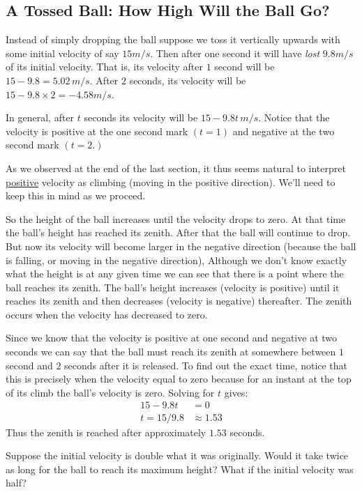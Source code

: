 \subsection{A Tossed Ball: How High Will the Ball Go?}
\label{subsec:tossed-ball}

Instead of simply dropping the ball suppose we toss it vertically
upwards with some initial velocity of say \(15 m/s.\) Then after one
second it will have \emph{lost} \(9.8 m/s\) of its initial
velocity. That is, its velocity after \(1\) second will be
\(15-9.8=5.02\,m/s.\) After \(2\) seconds, its velocity will be
\(15-9.8\times{}2=-4.58 m/s.\)

In general, after \(t\) seconds its velocity will be \(15-9.8t\, m/s.\) 
Notice that the velocity is positive at the one second mark $(t=1)$
and negative at the two second mark $(t=2.)$

As we observed at the end of the last section, it thus seems natural
to interpret \underline{positive} velocity as climbing (moving in the
positive direction). We'll need to keep this in mind as we proceed.

So the height of the ball increases until the velocity drops to
zero. At that time the ball's height has reached its zenith. After
that the ball will continue to drop. But now its velocity will become
larger in the negative direction (because the ball is falling, or
moving in the negative direction), Although we don't know exactly what
the height is at any given time we can see that there is a point where
the ball reaches its zenith. The ball's height increases (velocity is
positive) until it reaches its zenith and then decreases (velocity is
negative) thereafter. The zenith occurs when the velocity has
decreased to zero.

Since we know that the velocity is positive at one second and negative
at two seconds we can say that the ball must reach its zenith at
somewhere between \(1\) second and \(2\) seconds after it is released.
To find out the exact time, notice that this is precisely when the
velocity equal to zero because for an instant at the top of its climb
the ball's velocity is zero. Solving for $t$ gives:
\begin{align*}
  15-9.8 t&=0 \\
t=15/9.8&\approx 1.53 
\label{eq:accel}
\end{align*}
Thus the zenith is reached after approximately $1.53$ seconds.

\begin{embeddedproblem}{}
  Suppose the initial velocity is double what it was originally.
  Would it take twice as long for the ball to reach its maximum
  height?  What if the initial velocity was half?
\end{embeddedproblem}

